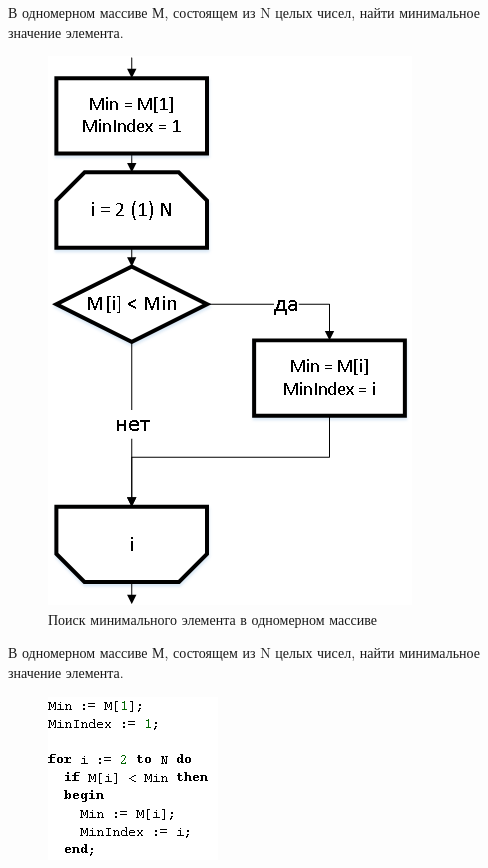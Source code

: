 \documentclass{beamer}
\begin{document}
\begin{frame}
В одномерном массиве М, состоящем из N целых чисел, найти минимальное значение элемента.
\begin{figure}[h]
\centering
\includegraphics[scale=0.35]{images/array_min.png}
\caption{Поиск минимального элемента в одномерном массиве}
\label{pic-search}
\end{figure}
\end{frame}

\begin{frame}
В одномерном массиве М, состоящем из N целых чисел, найти минимальное значение элемента.
\begin{figure}[h]
\centering
\includegraphics[scale=1.0]{images/array_min_code.png}
\label{pic-search-code}
\end{figure}
\end{frame}
\end{document}
